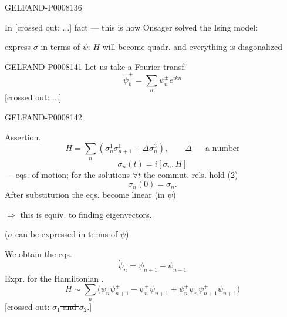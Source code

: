 \begin{GelfandAdjacentEvidence}{GELFAND-P000813}{6}


In [crossed out: \(\ldots\)] fact — this is how Onsager solved the Ising model:
\end{GelfandAdjacentEvidence}


express \(\sigma\) in terms of \(\psi\): \(H\) will become quadr. and everything is diagonalized


\begin{GelfandAdjacentEvidence}{GELFAND-P000814}{1}
Let us take a Fourier transf.
\begin{equation*}
\widetilde\psi_k^\pm=\sum_n\psi_n^\pm e^{ikn}\tag{5}
\end{equation*}
[crossed out: \(\ldots\)]
\end{GelfandAdjacentEvidence}
\begin{GelfandAdjacentEvidence}{GELFAND-P000814}{2}

\uline{Assertion}.
\begin{equation*}
H=\sum_n(\sigma_n^1\sigma_{n+1}^1+\Delta\sigma_n^3),\qquad
\Delta\text{ — a number}\tag{6}
\end{equation*}
\begin{equation*}
\dot\sigma_n(t)=i[\sigma_n,H]\tag{7}
\end{equation*}
— eqs. of motion; for the solutions \(\forall t\) the commut. rels. hold (2)
\[
\sigma_n(0)=\sigma_n.
\]
After substitution the eqs. become linear (in \(\psi\))

\(\Rightarrow\) this is equiv. to finding eigenvectors.

(\(\sigma\) can be expressed in terms of \(\psi\))

We obtain the eqs.
\begin{equation*}
\dot\psi_n=\psi_{n+1}-\psi_{n-1}\tag{8}
\end{equation*}
Expr. for the Hamiltonian .
\begin{equation*}
H\sim\sum_n\bigl(\psi_n\psi_{n+1}^+-\psi_n^+\psi_{n+1}
+\psi_n^+\psi_n\psi_{n+1}^+\psi_{n+1}\bigr)\tag{9}
\end{equation*}
[crossed out: \sout{\(\sigma_1\) and \(\sigma_2\)}.]
\end{GelfandAdjacentEvidence}
